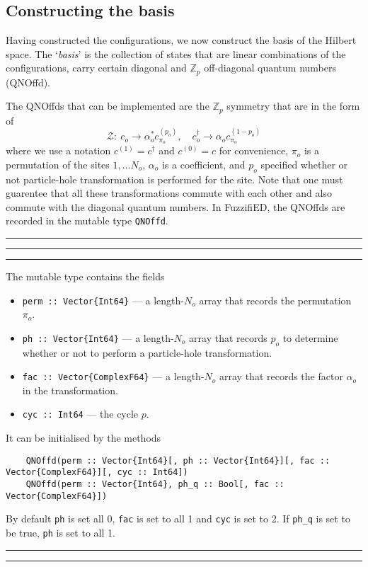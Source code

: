 \documentclass{timesjhep}
\newenvironment{block}[1]{\vspace{0.4\baselineskip}\hrule\vspace{0.10\baselineskip}\hrule\vspace{0.30\baselineskip}{\bfseries #1}\vspace{0.2\baselineskip}\hrule\vspace{0.3\baselineskip}
}{\vspace{0.2\baselineskip}\hrule\vspace{0.10\baselineskip}\hrule\vspace{0.5\baselineskip}}
\begin{document}
\subsection{Constructing the basis}

Having constructed the configurations, we now construct the basis of the Hilbert space. The `\textit{basis}' is the collection of states that are linear combinations of the configurations, carry certain diagonal and $\mathbb{Z}_p$ off-diagonal quantum numbers (QNOffd). 

The QNOffds that can be implemented are the $\mathbb{Z}_p$ symmetry that are in the form of 
\begin{equation}
    \mathscr{Z}:\ c_o\to \alpha_o^* c^{(p_o)}_{\pi_o},\quad c_o^\dagger\to \alpha_o c^{(1-p_o)}_{\pi_o}
\end{equation}
where we use a notation $c^{(1)}=c^\dagger$ and $c^{(0)}=c$ for convenience, $\pi_o$ is a permutation of the sites $1,\dots N_o$, $\alpha_o$ is a coefficient, and $p_o$ specified whether or not particle-hole transformation is performed for the site. Note that one must guarentee that all these transformations commute with each other and also commute with the diagonal quantum numbers. In FuzzifiED, the QNOffds are recorded in the mutable type \lstinline|QNOffd|. 

\begin{block}{\lstinline|QNOffd| --- Type}
The mutable type contains the fields
\begin{itemize}
    \item \lstinline|perm :: Vector{Int64}| --- a length-$N_o$ array that records the permutation $\pi_o$.
    \item \lstinline|ph :: Vector{Int64}| --- a length-$N_o$ array that records $p_o$ to determine whether or not to perform a particle-hole transformation.
    \item \lstinline|fac :: Vector{ComplexF64}| --- a length-$N_o$ array that records the factor $\alpha_o$ in the transformation.
    \item \lstinline|cyc :: Int64| --- the cycle $p$. 
\end{itemize}
It can be initialised by the methods
\begin{lstlisting}
    QNOffd(perm :: Vector{Int64}[, ph :: Vector{Int64}][, fac :: Vector{ComplexF64}][, cyc :: Int64])
    QNOffd(perm :: Vector{Int64}, ph_q :: Bool[, fac :: Vector{ComplexF64}])
\end{lstlisting}
By default \lstinline|ph| is set all 0, \lstinline|fac| is set to all 1 and \lstinline|cyc| is set to 2. If \lstinline|ph_q| is set to be true, \lstinline|ph| is set to all 1. 
\end{block}
\end{document}

